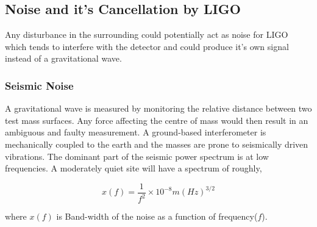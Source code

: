 \subsection{Noise and it's Cancellation by LIGO}

Any disturbance in the surrounding could potentially act as noise for LIGO which tends to interfere with the detector and could produce it's own signal instead of a gravitational wave.

\subsubsection{Seismic Noise}

A gravitational wave is measured by monitoring the relative distance between two test mass surfaces. Any force affecting the centre of mass would then result in an ambiguous and faulty measurement. A ground-based interferometer is mechanically coupled to the earth and the masses are prone to seismically driven vibrations. The dominant part of the seismic power spectrum is at low frequencies. A moderately quiet site will have a spectrum of roughly,

\begin{equation}
    x(f) = \frac{1}{f^2} \times 10^{-8}m(Hz)^{3/2}
\end{equation}

where $x(f)$ is Band-width of the noise as a function of frequency($f$).

